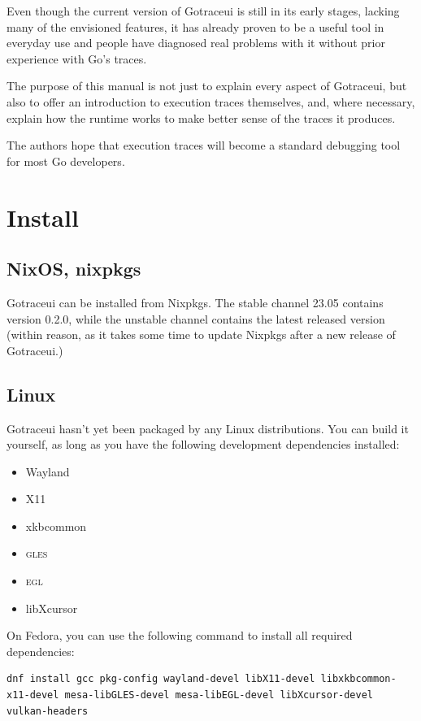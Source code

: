 \documentclass[10pt,letterpaper,oneside,openany,english]{memoir}
\newcommand{\code}[1]{{\ttfamily\mbox{#1}}}
\begin{document}
Even though the current version of Gotraceui is still in its early stages,
lacking many of the envisioned features,
it has already proven to be a useful tool in everyday use
and people have diagnosed real problems with it without prior experience with Go's traces.

The purpose of this manual is not just to explain every aspect of Gotraceui,
but also to offer an introduction to execution traces themselves,
and, where necessary, explain how the runtime works to make better sense of the traces it produces.

The authors hope that execution traces will become a standard debugging tool for most Go developers.

\chapter{Install}

\section*{NixOS, nixpkgs}

Gotraceui can be installed from Nixpkgs.
The stable channel \code{23.05} contains version 0.2.0,
while the unstable channel contains the latest released version
(within reason, as it takes some time to update Nixpkgs after a new release of Gotraceui.)

\section*{Linux}

Gotraceui hasn't yet been packaged by any Linux distributions.
You can build it yourself, as long as you have the following development dependencies installed:

\begin{itemize}
\item Wayland
\item X11
\item xkbcommon
\item \textsc{gles}
\item \textsc{egl}
\item libXcursor
\end{itemize}

On Fedora, you can use the following command to install all required dependencies:

\begin{verbatim}
dnf install gcc pkg-config wayland-devel libX11-devel libxkbcommon-x11-devel mesa-libGLES-devel mesa-libEGL-devel libXcursor-devel vulkan-headers
\end{verbatim}
\end{document}
